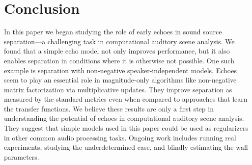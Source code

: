 \section{Conclusion}

In this paper we began studying the role of early echoes in sound source separation---a challenging task in computational auditory scene analysis.
We found that a simple echo model not only improves performance, but it also enables separation in conditions where it is otherwise not possible.
One such example is separation with non-negative speaker-independent models.
Echoes seem to play an essential role in magnitude-only algorithms like non-negative matrix factorization via multiplicative updates.
They improve separation as measured by the standard metrics even when compared to approaches that learn the transfer functions.
We believe these results are only a first step in understanding the potential of echoes in computational auditory scene analysis.
They suggest that simple models used in this paper could be used as regularizers in other common audio processing tasks.
Ongoing work includes running real experiments, studying the underdetermined case, and blindly estimating the wall parameters.

